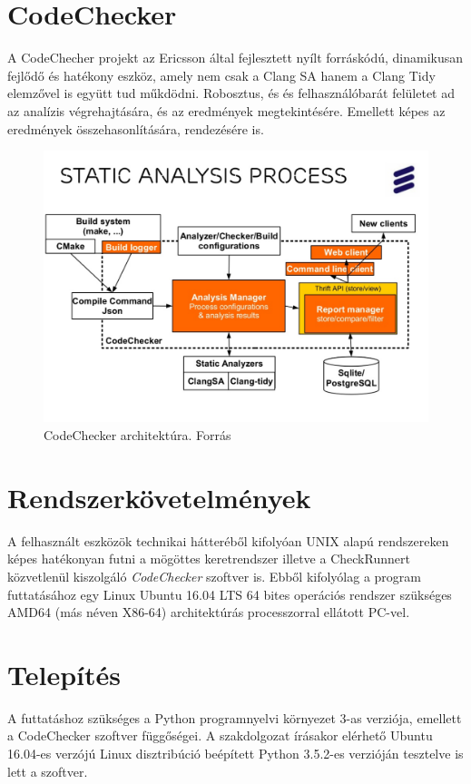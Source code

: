 \documentclass[a4paper,12pt]{report}
\begin{document}
\section{CodeChecker}
A CodeChecher projekt az Ericsson által fejlesztett nyílt forráskódú, dinamikusan fejlődő és hatékony eszköz, amely nem csak a Clang SA hanem a Clang Tidy elemzővel is együtt tud műkdödni. Robosztus, és és felhasználóbarát felületet ad az analízis végrehajtására, és az eredmények megtekintésére. Emellett képes az eredmények összehasonlítására, rendezésére is.

\begin{figure}[h]
\caption{CodeChecker architektúra. Forrás \cite{codecheckerslide}}
\centering
\includegraphics[scale=0.2]{codechecker.png}
\end{figure}

\section{Rendszerkövetelmények}
A felhasznált eszközök technikai hátteréből kifolyóan UNIX alapú rendszereken képes hatékonyan futni a mögöttes keretrendszer illetve a CheckRunnert közvetlenül kiszolgáló \emph{CodeChecker} szoftver is. Ebből kifolyólag a program futtatásához egy Linux Ubuntu 16.04 LTS 64 bites operációs rendszer szükséges AMD64 (más néven X86-64) architektúrás processzorral ellátott PC-vel.

\section{Telepítés}
A futtatáshoz szükséges a Python programnyelvi környezet 3-as verziója, emellett a CodeChecker szoftver függőségei. A szakdolgozat írásakor elérhető Ubuntu 16.04-es verzójú Linux disztribúció beépített Python 3.5.2-es verzióján tesztelve is lett a szoftver.
\end{document}
